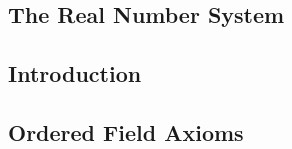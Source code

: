 \documentclass[8pt,landscape]{article}
\begin{document}
\begin{multicols}{3}

    \section{The Real Number System}

    \subsection{Introduction}

    \subsection{Ordered Field Axioms}






\end{multicols}
\end{document}
